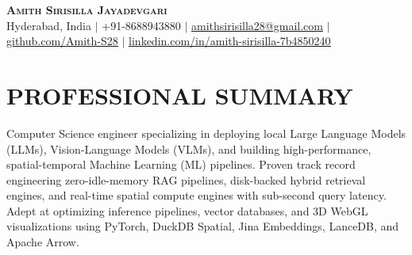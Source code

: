 \documentclass[letterpaper,10pt]{article}
\begin{document}
\begin{center}
    \textbf{\Huge \scshape Amith Sirisilla Jayadevgari} \\ \vspace{2pt}
    \small Hyderabad, India $|$ +91-8688943880 $|$ \href{mailto:amithsirisilla28@gmail.com}{\underline{amithsirisilla28@gmail.com}} $|$
    \href{https://github.com/Amith-S28}{\underline{github.com/Amith-S28}} $|$ \href{https://www.linkedin.com/in/amith-sirisilla-7b4850240/}{\underline{linkedin.com/in/amith-sirisilla-7b4850240}}
\end{center}

\section{PROFESSIONAL SUMMARY}
Computer Science engineer specializing in deploying local Large Language Models (LLMs), Vision-Language Models (VLMs), and building high-performance, spatial-temporal Machine Learning (ML) pipelines. Proven track record engineering zero-idle-memory RAG pipelines, disk-backed hybrid retrieval engines, and real-time spatial compute engines with sub-second query latency. Adept at optimizing inference pipelines, vector databases, and 3D WebGL visualizations using PyTorch, DuckDB Spatial, Jina Embeddings, LanceDB, and Apache Arrow.

\end{document}
